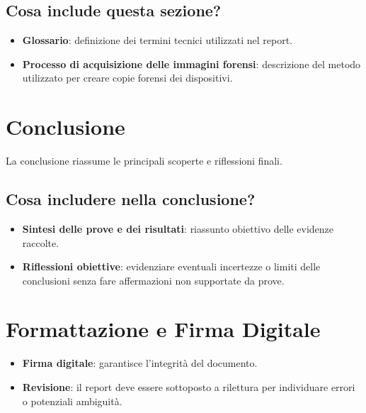 \documentclass[a4paper,12pt]{report}
\begin{document}
\subsection{Cosa include questa sezione?}
\begin{itemize}
    \item \textbf{Glossario}: definizione dei termini tecnici utilizzati nel report.
    \item \textbf{Processo di acquisizione delle immagini forensi}: descrizione del metodo utilizzato per creare copie forensi dei dispositivi.
\end{itemize}

\section{Conclusione}
La conclusione riassume le principali scoperte e riflessioni finali.

\subsection{Cosa includere nella conclusione?}
\begin{itemize}
    \item \textbf{Sintesi delle prove e dei risultati}: riassunto obiettivo delle evidenze raccolte.
    \item \textbf{Riflessioni obiettive}: evidenziare eventuali incertezze o limiti delle conclusioni senza fare affermazioni non supportate da prove.
\end{itemize}

\section{Formattazione e Firma Digitale}
\begin{itemize}
    \item \textbf{Firma digitale}: garantisce l'integrità del documento.
    \item \textbf{Revisione}: il report deve essere sottoposto a rilettura per individuare errori o potenziali ambiguità.
\end{itemize}
\end{document}
